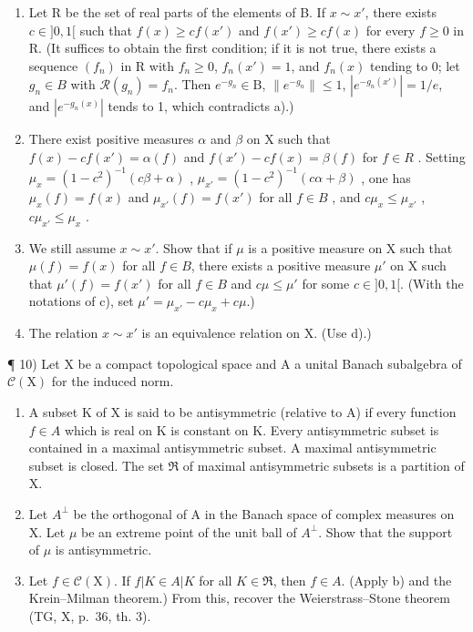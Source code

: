 \begin{enumerate}
\def\labelenumi{\alph{enumi})}
\setcounter{enumi}{1}
\item
  Let R be the set of real parts of the elements of B. If \(x \sim x'\), there exists \(c \in ]0,1[\) such that \(f(x) \geqslant cf(x')\) and \(f(x') \geqslant cf(x)\) for every \(f \geqslant 0\) in R. (It suffices to obtain the first condition; if it is not true, there exists a sequence \((f_n)\) in R with \(f_n \geqslant 0\), \(f_n(x') = 1\), and \(f_n(x)\) tending to 0; let \(g_n \in B\) with \(\mathcal{R}(g_n) = f_n\). Then \(e^{-g_n} \in \mathrm{B}\), \(\| e^{-g_n} \| \leqslant 1\), \(|e^{-g_n(x')}| = 1 / e\), and \(|e^{-g_n(x)}|\) tends to 1, which contradicts a).)
\item
  There exist positive measures \(\alpha\) and \(\beta\) on X such that \(f(x)-cf(x')=\alpha(f)\) and \(f(x')-cf(x)=\beta(f)\) for \(f\in R\) . Setting \(\mu_{x}=(1-c^{2})^{-1}(c\beta+\alpha)\) , \(\mu_{x'}=(1-c^{2})^{-1}(c\alpha+\beta)\) , one has \(\mu_{x}(f)=f(x)\) and \(\mu_{x'}(f)=f(x')\) for all \(f\in B\) , and \(c\mu_{x}\leqslant\mu_{x'}\) , \(c\mu_{x'}\leqslant\mu_{x}\) .
\item
  We still assume \(x \sim x'\). Show that if \(\mu\) is a positive measure on X such that \(\mu(f) = f(x)\) for all \(f \in B\), there exists a positive measure \(\mu'\) on X such that \(\mu'(f) = f(x')\) for all \(f \in B\) and \(c\mu \leqslant \mu'\) for some \(c \in]0,1[\). (With the notations of c), set \(\mu' = \mu_{x'} - c\mu_x + c\mu\).)
\item
  The relation \(x \sim x'\) is an equivalence relation on X. (Use d).)
\end{enumerate}

¶ 10) Let X be a compact topological space and A a unital Banach subalgebra of \(\mathcal{C}(\mathrm{X})\) for the induced norm.

\begin{enumerate}
\def\labelenumi{\alph{enumi})}
\item
  A subset K of X is said to be antisymmetric (relative to A) if every function \(f \in A\) which is real on K is constant on K. Every antisymmetric subset is contained in a maximal antisymmetric subset. A maximal antisymmetric subset is closed. The set \(\mathfrak{R}\) of maximal antisymmetric subsets is a partition of X.
\item
  Let \(A^{\perp}\) be the orthogonal of A in the Banach space of complex measures on X. Let \(\mu\) be an extreme point of the unit ball of \(A^{\perp}\). Show that the support of \(\mu\) is antisymmetric.
\item
  Let \(f \in \mathcal{C}(\mathrm{X})\). If \(f|K \in A|K\) for all \(K \in \mathfrak{R}\), then \(f \in A\). (Apply b) and the Krein–Milman theorem.) From this, recover the Weierstrass–Stone theorem (TG, X, p.~36, th. 3).
\end{enumerate}

